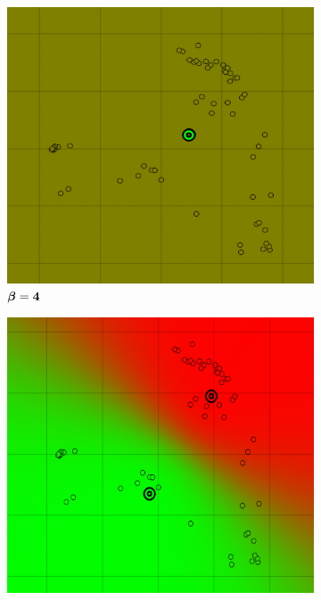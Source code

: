 \begin{figure}[!h]
\centering
	\begin{subfigure}[h]{0.30\textwidth}
    \centering
	\includegraphics[height=0.13\textheight]{./clustering/soft_k_mean_beta_4.png}
	\caption{$\boldsymbol \beta \bf = 4$}
	\end{subfigure}
    \begin{subfigure}[h]{0.30\textwidth}
    \centering
    \includegraphics[height=0.13\textheight]{./clustering/soft_k_mean_beta_10.png}

\end{subfigure}
\end{figure}
